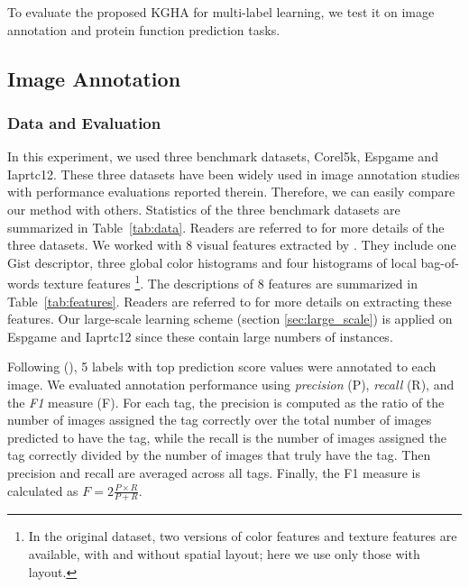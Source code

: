\documentclass[a4paper]{article}
\begin{document}
To evaluate the proposed KGHA for multi-label learning, we test it on image annotation and protein function prediction tasks.  
\subsection{Image Annotation}
\subsubsection{Data and Evaluation}
In this experiment, we used three benchmark datasets, \textsf{Corel5k}, \textsf{Espgame} and \textsf{Iaprtc12}. 
These three datasets have been widely used in image annotation studies \cite{GMVS09,baseline,chen_2013_icml} with 
performance evaluations reported therein.  Therefore, we can easily compare our method with others.   
Statistics of the three benchmark datasets are summarized in Table~\ref{tab:data}.
Readers are referred to \citet{baseline} for more details of the three datasets.  
We worked with 8 visual features extracted by \citet{GMVS09}.
They include one Gist descriptor, three global color histograms and four histograms of local bag-of-words texture features%
\footnote{In the original dataset, two versions of color features 
and texture features are available, with and without spatial layout; here we use only those with layout.}. The descriptions of 8 features are 
summarized in Table~\ref{tab:features}. Readers are referred to \citet{GMVS09} for more details on extracting these features.
Our large-scale learning scheme (section \ref{sec:large_scale}) is applied on \textsf{Espgame} and \textsf{Iaprtc12} since these contain large numbers of instances.    

Following \citeauthor{chen_2013_icml} (\citeyear{chen_2013_icml}), 5 labels with top prediction 
score values were annotated to each image. We evaluated annotation performance using \emph{precision} (P), \emph{recall} (R), and the \emph{F1} measure (F). For each tag, the precision is 
computed as the ratio of the number of images assigned the tag correctly over the total number of images predicted to have the tag, while the recall is the number of images 
assigned the tag correctly divided by the number of images that truly have the tag. Then precision and recall are averaged across all tags. Finally, the F1 measure is calculated as 
$F=2\frac{P\times R}{P+R}$.
\end{document}
